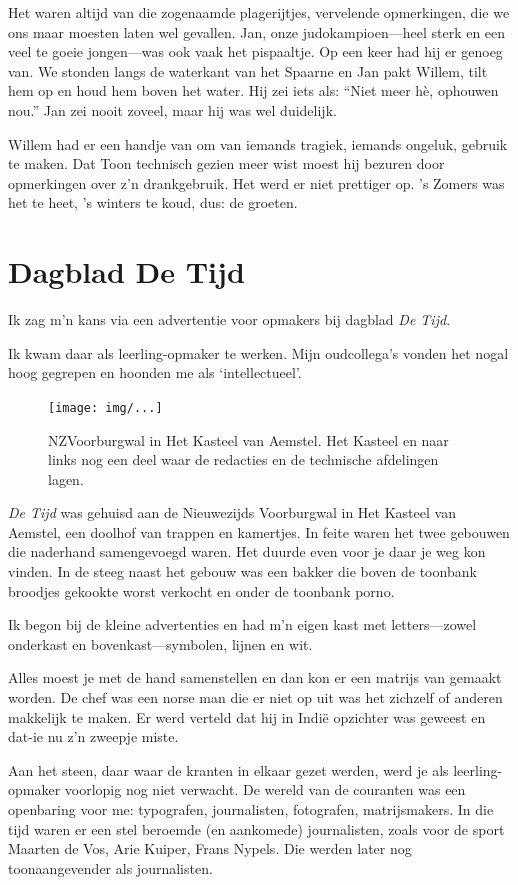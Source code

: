 \documentclass[12pt,twoside, openright]{memoir}
\begin{document}
Het waren altijd van die zogenaamde plagerijtjes, vervelende opmerkingen, die we ons maar moesten laten wel gevallen. Jan, onze judokampioen---heel sterk en een veel te goeie jongen---was ook vaak het pispaaltje. Op een keer had hij er genoeg van. We stonden langs de waterkant van het Spaarne en Jan pakt Willem, tilt hem op en houd hem boven het water. Hij zei iets als: ``Niet meer hè, ophouwen nou.'' Jan zei nooit zoveel, maar hij was wel duidelijk.

Willem had er een handje van om van iemands tragiek, iemands ongeluk, gebruik te maken. Dat Toon technisch gezien meer wist moest hij bezuren door opmerkingen over z’n drankgebruik. Het werd er niet prettiger op. ’s Zomers was het te heet, ’s winters te koud, dus: de groeten.

\chapter{Dagblad De Tijd} %
\label{cha:detijd}

Ik zag m’n kans via een advertentie voor opmakers bij dagblad \emph{De Tijd}.

Ik kwam daar als leerling-opmaker te werken. Mijn oudcollega’s vonden het nogal hoog gegrepen en hoonden me als `intellectueel'.

\begin{figure}[t]
\texttt{[image: img/...]}
\caption{NZVoorburgwal in Het Kasteel van Aemstel. Het Kasteel en naar links nog een deel waar de redacties en de technische afdelingen lagen.}
\end{figure}

\emph{De Tijd} was gehuisd aan de Nieuwezijds Voorburgwal in Het Kasteel van Aemstel, een doolhof van trappen en kamertjes. In feite waren het twee gebouwen die naderhand samengevoegd waren. Het duurde even voor je daar je weg kon vinden. In de steeg naast het gebouw was een bakker die boven de toonbank broodjes gekookte worst verkocht en onder de toonbank porno. 

Ik begon bij de kleine advertenties en had m'n eigen kast met letters---zowel onderkast en bovenkast---symbolen, lijnen en wit.

Alles moest je met de hand samenstellen en dan kon er een matrijs van gemaakt worden. De chef was een norse man die er niet op uit was het zichzelf of anderen makkelijk te maken. Er werd verteld dat hij in Indië opzichter was geweest en dat-ie nu z'n zweepje miste.

Aan het steen, daar waar de kranten in elkaar gezet werden, werd je als leerling-opmaker voorlopig nog niet verwacht. De wereld van de couranten was een openbaring voor me: typografen, journalisten, fotografen, matrijsmakers. In die tijd waren er een stel beroemde (en aankomede) journalisten, zoals voor de sport Maarten de Vos, Arie Kuiper, Frans Nypels. Die werden later nog toonaangevender als journalisten. 
\end{document}
